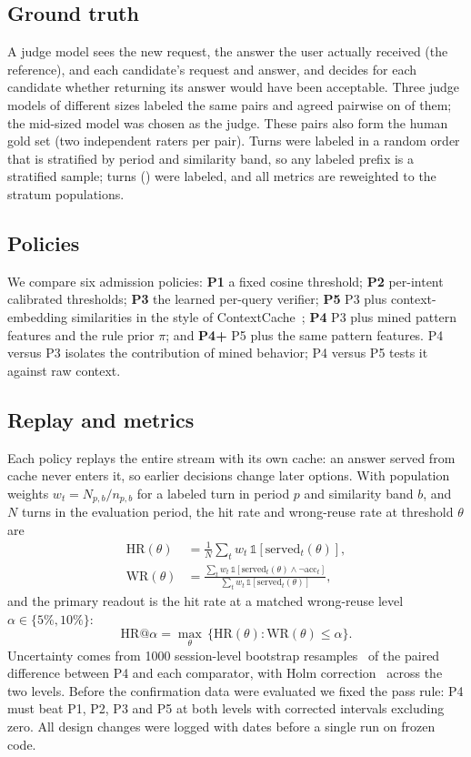 \documentclass[conference]{IEEEtran}
\begin{document}
\subsection{Ground truth}
A judge model sees the new request, the answer the user actually received (the reference), and each candidate's request and answer, and decides for each candidate whether returning its answer would have been acceptable. Three judge models of different sizes labeled the same \nPickPairs{} pairs and agreed pairwise on \judgeAgreeRange{} of them; the mid-sized model was chosen as the judge. These pairs also form the human gold set (two independent raters per pair). Turns were labeled in a random order that is stratified by period and similarity band, so any labeled prefix is a stratified sample; \nLabeledTurns{} turns () were labeled, and all metrics are reweighted to the stratum populations.

\subsection{Policies}
We compare six admission policies: \textbf{P1} a fixed cosine threshold; \textbf{P2} per-intent calibrated thresholds; \textbf{P3} the learned per-query verifier; \textbf{P5} P3 plus context-embedding similarities in the style of ContextCache~\cite{yan2025contextcache}; \textbf{P4} P3 plus mined pattern features and the rule prior $\pi$; and \textbf{P4+} P5 plus the same pattern features. P4 versus P3 isolates the contribution of mined behavior; P4 versus P5 tests it against raw context.

\subsection{Replay and metrics}
Each policy replays the entire stream with its own cache: an answer served from cache never enters it, so earlier decisions change later options. With population weights $w_t=N_{p,b}/n_{p,b}$ for a labeled turn in period $p$ and similarity band $b$, and $N$ turns in the evaluation period, the hit rate and wrong-reuse rate at threshold $\theta$ are
\begin{align}
\mathrm{HR}(\theta) &= \frac{1}{N}\sum_t w_t\,\mathbb{1}[\text{served}_t(\theta)], \\
\mathrm{WR}(\theta) &= \frac{\sum_t w_t\,\mathbb{1}[\text{served}_t(\theta)\wedge\neg\text{acc}_t]}{\sum_t w_t\,\mathbb{1}[\text{served}_t(\theta)]},
\end{align}
and the primary readout is the hit rate at a matched wrong-reuse level $\alpha\in\{5\%,10\%\}$:
\begin{equation}
\mathrm{HR}@\alpha = \max_\theta\,\{\mathrm{HR}(\theta) : \mathrm{WR}(\theta)\le\alpha\}. \label{eq:hra}
\end{equation}
Uncertainty comes from 1000 session-level bootstrap resamples~\cite{efron1993bootstrap} of the paired difference between P4 and each comparator, with Holm correction~\cite{holm1979} across the two levels. Before the confirmation data were evaluated we fixed the pass rule: P4 must beat P1, P2, P3 and P5 at both levels with corrected intervals excluding zero. All design changes were logged with dates before a single run on frozen code.
\end{document}
